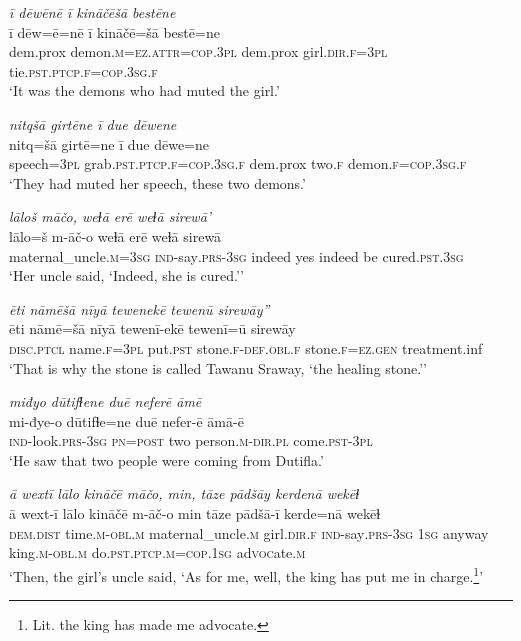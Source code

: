 \ea \label{ŽP.177}
\textit{ī dēwēnē ī kināčēšā bestēne} \\ 
\gll ī dēw=ē=nē ī kināčē=šā bestē=ne \\ 
 dem.prox demon\textsc{.m}\textsc{=ez}.\textsc{attr}\textsc{=cop}\textsc{.3pl} dem.prox girl\textsc{.dir}\textsc{.f}\textsc{=3pl} tie\textsc{.pst}\textsc{.ptcp}\textsc{.f}\textsc{=cop}\textsc{.3sg}\textsc{.f} \\ 
\glt `It was the demons who had muted the girl.'
\z 
 
\ea \label{ŽP.178}
\textit{nitqšā girtēne ī due dēwene} \\ 
\gll nitq=šā girtē=ne ī due dēwe=ne \\ 
 speech\textsc{=3pl} grab\textsc{.pst}\textsc{.ptcp}\textsc{.f}\textsc{=cop}\textsc{.3sg}\textsc{.f} dem.prox two\textsc{.f} demon\textsc{.f}\textsc{=cop}\textsc{.3sg}\textsc{.f} \\ 
\glt `They had muted her speech, these two demons.'
\z 
 
\ea \label{ŽP.184}
\textit{lāloš māčo, weɫā erē weɫā sirewā’} \\ 
\gll lālo=š m-āč-o weɫā erē weɫā sirewā \\ 
 maternal\_uncle\textsc{.m}\textsc{=3sg} \textsc{ind-}say\textsc{.prs}\textsc{-3sg} indeed yes indeed be cured\textsc{.pst}\textsc{.3sg} \\ 
\glt `Her uncle said, ‘Indeed, she is cured.’'
\z 
 
\ea \label{ŽP.185}
\textit{ēti nāmēšā nīyā tewenekē tewenū sirewāy”} \\ 
\gll ēti nāmē=šā nīyā tewenī-ekē tewenī=ū sirewāy \\ 
 \textsc{disc.ptcl} name\textsc{.f}\textsc{=3pl} put\textsc{.pst} stone\textsc{.f}\textsc{-def}\textsc{.obl}\textsc{.f} stone\textsc{.f}\textsc{\textsc{=ez.gen}} treatment.inf \\ 
\glt `That is why the stone is called Tawanu Sraway, ‘the healing stone.’'
\z 
 
\ea \label{ŽP.191}
\textit{miđyo dūtifɫene duē neferē āmē} \\ 
\gll mi-đye-o dūtifɫe=ne duē nefer-ē āmā-ē \\ 
 \textsc{ind-}look\textsc{.prs}\textsc{-3sg} \textsc{pn}\textsc{=\textsc{post}} two person\textsc{.m}\textsc{-dir}\textsc{.pl} come\textsc{.pst}\textsc{-3pl} \\ 
\glt `He saw that two people were coming from Dutifla.'
\z 
 
\ea \label{ŽP.206}
\textit{ā wextī lālo kināčē māčo, min, tāze pādšāy kerdenā wekēɫ} \\ 
\gll ā wext-ī lālo kināčē m-āč-o min tāze pādšā-ī kerde=nā wekēɫ \\ 
 \textsc{dem.dist} time\textsc{.m}\textsc{-obl}\textsc{.m} maternal\_uncle\textsc{.m} girl\textsc{.dir}\textsc{.f} \textsc{ind-}say\textsc{.prs}\textsc{-3sg} \textsc{1sg} anyway king\textsc{.m}\textsc{-obl}\textsc{.m} do\textsc{.pst}\textsc{.ptcp}\textsc{.m}\textsc{=cop}\textsc{.\textsc{1sg}} ad\textsc{voc}ate\textsc{.m} \\ 
\glt `Then, the girl’s uncle said, ‘As for me, well, the king has put me in charge.\footnote{Lit. the king has made me advocate.}'
\z 
 
